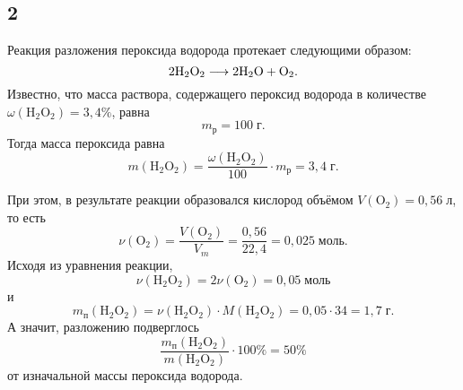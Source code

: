 \subsection{2}

Реакция разложения пероксида водорода протекает следующими образом:
\[
\rm 2H_2O_2\longrightarrow 2H_2O+O_2.
\]
Известно, что масса раствора, содержащего пероксид водорода в количестве $\omega(\mathrm{H_2O_2})=3{,}4\%$, равна
\[
m_\text{р}=100\;\text{г}.
\]
Тогда масса пероксида равна
\[
m(\mathrm{H_2O_2})=\frac{\omega(\mathrm{H_2O_2})}{100}\cdot m_\text{р}=3{,}4\;\text{г}.
\]

При этом, в результате реакции образовался кислород объёмом $V(\mathrm{O_2})=0{,}56\;\text{л}$, то есть
\[
\nu(\mathrm{O_2})=\frac{V(\mathrm{O_2})}{V_m}=\frac{0{,}56}{22{,}4}=0{,}025\;\text{моль}.
\]
Исходя из уравнения реакции,
\[
\nu(\mathrm{H_2O_2})=2\nu(\mathrm{O_2})=0{,}05\;\text{моль}
\]
и
\[
m_\text{п}(\mathrm{H_2O_2})=\nu(\mathrm{H_2O_2})\cdot M(\mathrm{H_2O_2})=0{,}05\cdot34=1{,}7\;\text{г}.
\]
А значит, разложению подверглось
\[
\frac{m_\text{п}(\mathrm{H_2O_2})}{m(\mathrm{H_2O_2})}\cdot100\%=50\%
\]
от изначальной массы пероксида водорода.